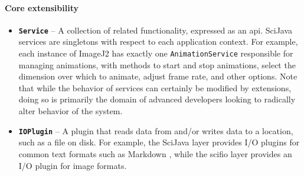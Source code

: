 \documentclass{bmcart}
\begin{document}
\paragraph*{Core extensibility}
\begin{itemize}
  \item \textbf{\texttt{Service}} -- A collection of related functionality,
    expressed as an \acrfull{api}. SciJava services are singletons with respect
    to each application context. For example, each instance of ImageJ2 has
    exactly one \texttt{AnimationService} responsible for managing animations,
    with methods to start and stop animations, select the dimension over which
    to animate, adjust frame rate, and other options. Note that while the
    behavior of services can certainly be modified by extensions, doing so is
    primarily the domain of advanced developers looking to radically alter
    behavior of the system.
  \item \textbf{\texttt{IOPlugin}} -- A plugin that reads data from and/or
    writes data to a location, such as a file on disk. For example, the SciJava
    layer provides I/O plugins for common text formats such as Markdown
    \cite{markdown}, while the \acrshort{scifio} layer provides an I/O plugin
    for image formats.
\end{itemize}
\end{document}
